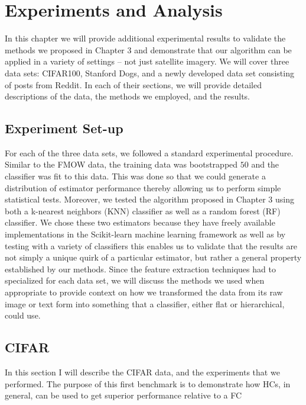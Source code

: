 \documentclass[../thesis.tex]{subfiles}
\begin{document}
\chapter{Experiments and Analysis}
In this chapter we will provide additional experimental results to validate the methods we proposed in Chapter 3 and demonstrate that our algorithm can be applied in a variety of settings -- not just satellite imagery. We will cover three data sets: CIFAR100, Stanford Dogs, and a newly developed data set consisting of posts from Reddit. In each of their sections, we will provide detailed descriptions of the data, the methods we employed, and the results.

\section{Experiment Set-up}
For each of the three data sets, we followed a standard experimental procedure. Similar to the FMOW data, the training data was bootstrapped $50$ and the classifier was fit to this data. This was done so that we could generate a distribution of estimator performance thereby allowing us to perform simple statistical tests. Moreover, we tested the algorithm proposed in Chapter 3 using both a k-nearest neighbors (KNN) classifier as well as a random forest (RF) classifier. We chose these two estimators because they have freely available implementations in the Scikit-learn machine learning framework as well as by testing with a variety of classifiers this enables us to validate that the results are not simply a unique quirk of a particular estimator, but rather a general property established by our methods. Since the feature extraction techniques had to specialized for each data set, we will discuss the methods we used when appropriate to provide context on how we transformed the data from its raw image or text form into something that a classifier, either flat or hierarchical, could use.

\section{CIFAR}

In this section I will describe the CIFAR data, and the experiments that we performed. The purpose of this first benchmark is to demonstrate how HCs, in general, can be used to get superior performance relative to a FC
\end{document}
